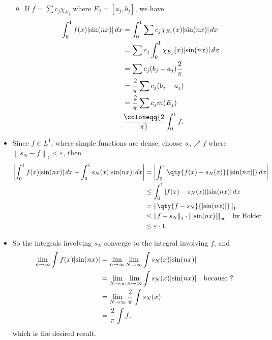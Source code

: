 \begin{solution}
\begin{itemize}
  \begin{itemize}
  \tightlist
  \item
    If \(f = \sum c_j \chi_{E_j}\) where \(E_j = [a_j, b_j]\), we have
    \begin{align*}  
    \int_0^1 f(x) {\left\lvert {\sin(nx)} \right\rvert}\,dx 
    &= \int_0^1 \sum c_j \chi_{E_j}(x) {\left\lvert {\sin(nx)} \right\rvert}\,dx  \\
    &= \sum c_j \int_0^1 \chi_{E_j}(x) {\left\lvert {\sin(nx)} \right\rvert}\,dx \\
    &= \sum c_j (b_j - a_j) {2\over \pi} \\
    &= {2\over \pi} \sum c_j (b_j - a_j) \\
    &= {2\over \pi} \sum c_j m(E_j) \\
    &\coloneqq{2\over \pi} \int_0^1 f
    .\end{align*}
  \end{itemize}
\item
  Since \(f\in L^1\), where simple functions are dense, choose
  \(s_n\nearrow f\) where
  \({\left\lVert {s_N - f} \right\rVert}_1 < \varepsilon\), then
  \begin{align*}  
  {\left\lvert { \int_0^1 f(x) {\left\lvert {\sin(nx)} \right\rvert} \,dx - \int_0^1 s_N(x) {\left\lvert {\sin(nx)} \right\rvert}\,dx } \right\rvert} 
  &= {\left\lvert { \int_0^1 \qty{f(x) - s_N(x)} {\left\lvert {\sin(nx)} \right\rvert} \,dx } \right\rvert} \\
  &\leq \int_0^1 {\left\lvert { f(x) - s_N(x)} \right\rvert} {\left\lvert {\sin(nx)} \right\rvert} \,dx \\
  &= {\left\lVert { \qty{f - s_N} {\left\lvert {\sin(nx)} \right\rvert} } \right\rVert}_1 \\
  &\leq {\left\lVert {f-s_N} \right\rVert}_1 \cdot {\left\lVert {{\left\lvert {\sin(nx)} \right\rvert}} \right\rVert}_\infty \quad\text{by Holder}\\
  &\leq \varepsilon\cdot 1
  ,\end{align*}
\item
  So the integrals involving \(s_N\) converge to the integral involving
  \(f\), and
  \begin{align*}
  \lim_{n\to\infty} \int f(x){\left\lvert {\sin(nx)} \right\rvert} 
  &= \lim_{n\to\infty} \lim_{N\to\infty} \int s_N(x) {\left\lvert {\sin(nx)} \right\rvert} \\
  &= \lim_{N\to\infty} \lim_{n\to\infty} \int s_N(x) {\left\lvert {\sin(nx)} \right\rvert} \quad\text{because ?}\\
  &= \lim_{N\to \infty} {2\over \pi} \int s_N(x) \\
  &= {2\over \pi} \int f
  ,\end{align*}
  which is the desired result.
\end{itemize}

\end{solution}

